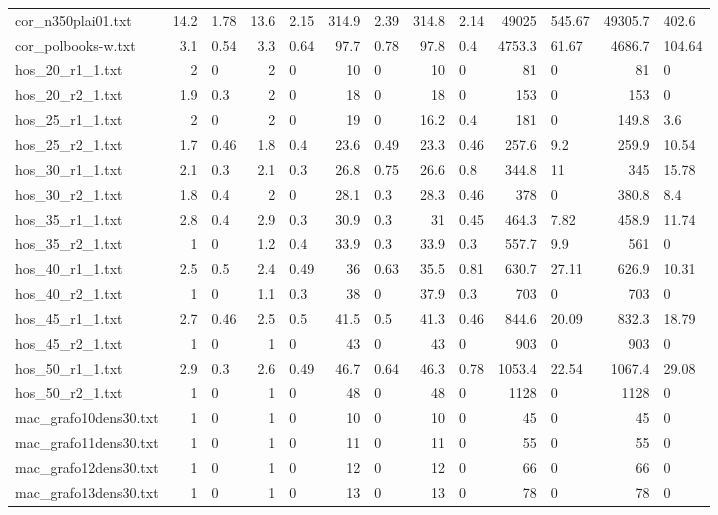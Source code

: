 \begin{tabular}{l r@{$\,\pm\,$}l r@{$\,\pm\,$}l r@{$\,\pm\,$}l r@{$\,\pm\,$}l r@{$\,\pm\,$}l r@{$\,\pm\,$}l}
cor\_n350plai01.txt & 14.2 & 1.78 & 13.6 & 2.15 & 314.9 & 2.39 & 314.8 & 2.14 & 49025 & 545.67 & 49305.7 & 402.6 \\
cor\_polbooks-w.txt & 3.1 & 0.54 & 3.3 & 0.64 & 97.7 & 0.78 & 97.8 & 0.4 & 4753.3 & 61.67 & 4686.7 & 104.64 \\
hos\_20\_r1\_1.txt & 2 & 0 & 2 & 0 & 10 & 0 & 10 & 0 & 81 & 0 & 81 & 0 \\
hos\_20\_r2\_1.txt & 1.9 & 0.3 & 2 & 0 & 18 & 0 & 18 & 0 & 153 & 0 & 153 & 0 \\
hos\_25\_r1\_1.txt & 2 & 0 & 2 & 0 & 19 & 0 & 16.2 & 0.4 & 181 & 0 & 149.8 & 3.6 \\
hos\_25\_r2\_1.txt & 1.7 & 0.46 & 1.8 & 0.4 & 23.6 & 0.49 & 23.3 & 0.46 & 257.6 & 9.2 & 259.9 & 10.54 \\
hos\_30\_r1\_1.txt & 2.1 & 0.3 & 2.1 & 0.3 & 26.8 & 0.75 & 26.6 & 0.8 & 344.8 & 11 & 345 & 15.78 \\
hos\_30\_r2\_1.txt & 1.8 & 0.4 & 2 & 0 & 28.1 & 0.3 & 28.3 & 0.46 & 378 & 0 & 380.8 & 8.4 \\
hos\_35\_r1\_1.txt & 2.8 & 0.4 & 2.9 & 0.3 & 30.9 & 0.3 & 31 & 0.45 & 464.3 & 7.82 & 458.9 & 11.74 \\
hos\_35\_r2\_1.txt & 1 & 0 & 1.2 & 0.4 & 33.9 & 0.3 & 33.9 & 0.3 & 557.7 & 9.9 & 561 & 0 \\
hos\_40\_r1\_1.txt & 2.5 & 0.5 & 2.4 & 0.49 & 36 & 0.63 & 35.5 & 0.81 & 630.7 & 27.11 & 626.9 & 10.31 \\
hos\_40\_r2\_1.txt & 1 & 0 & 1.1 & 0.3 & 38 & 0 & 37.9 & 0.3 & 703 & 0 & 703 & 0 \\
hos\_45\_r1\_1.txt & 2.7 & 0.46 & 2.5 & 0.5 & 41.5 & 0.5 & 41.3 & 0.46 & 844.6 & 20.09 & 832.3 & 18.79 \\
hos\_45\_r2\_1.txt & 1 & 0 & 1 & 0 & 43 & 0 & 43 & 0 & 903 & 0 & 903 & 0 \\
hos\_50\_r1\_1.txt & 2.9 & 0.3 & 2.6 & 0.49 & 46.7 & 0.64 & 46.3 & 0.78 & 1053.4 & 22.54 & 1067.4 & 29.08 \\
hos\_50\_r2\_1.txt & 1 & 0 & 1 & 0 & 48 & 0 & 48 & 0 & 1128 & 0 & 1128 & 0 \\
mac\_grafo10dens30.txt & 1 & 0 & 1 & 0 & 10 & 0 & 10 & 0 & 45 & 0 & 45 & 0 \\
mac\_grafo11dens30.txt & 1 & 0 & 1 & 0 & 11 & 0 & 11 & 0 & 55 & 0 & 55 & 0 \\
mac\_grafo12dens30.txt & 1 & 0 & 1 & 0 & 12 & 0 & 12 & 0 & 66 & 0 & 66 & 0 \\
mac\_grafo13dens30.txt & 1 & 0 & 1 & 0 & 13 & 0 & 13 & 0 & 78 & 0 & 78 & 0 \\

\end{tabular}
